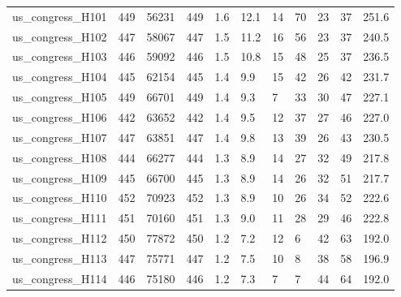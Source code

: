 \begin{longtable}{lllllllllll}
 us\_congress\_H101                                   & 449        & 56231     & 449   & 1.6    & 12.1   & 14    & 70     & 23     & 37     & 251.6   \\
 us\_congress\_H102                                   & 447        & 58067     & 447   & 1.5    & 11.2   & 16    & 56     & 23     & 37     & 240.5   \\
 us\_congress\_H103                                   & 446        & 59092     & 446   & 1.5    & 10.8   & 15    & 48     & 25     & 37     & 236.5   \\
 us\_congress\_H104                                   & 445        & 62154     & 445   & 1.4    & 9.9    & 15    & 42     & 26     & 42     & 231.7   \\
 us\_congress\_H105                                   & 449        & 66701     & 449   & 1.4    & 9.3    & 7     & 33     & 30     & 47     & 227.1   \\
 us\_congress\_H106                                   & 442        & 63652     & 442   & 1.4    & 9.5    & 12    & 37     & 27     & 46     & 227.0   \\
 us\_congress\_H107                                   & 447        & 63851     & 447   & 1.4    & 9.8    & 13    & 39     & 26     & 43     & 230.5   \\
 us\_congress\_H108                                   & 444        & 66277     & 444   & 1.3    & 8.9    & 14    & 27     & 32     & 49     & 217.8   \\
 us\_congress\_H109                                   & 445        & 66700     & 445   & 1.3    & 8.9    & 14    & 26     & 32     & 51     & 217.7   \\
 us\_congress\_H110                                   & 452        & 70923     & 452   & 1.3    & 8.9    & 10    & 26     & 34     & 52     & 222.6   \\
 us\_congress\_H111                                   & 451        & 70160     & 451   & 1.3    & 9.0    & 11    & 28     & 29     & 46     & 222.8   \\
 us\_congress\_H112                                   & 450        & 77872     & 450   & 1.2    & 7.2    & 12    & 6      & 42     & 63     & 192.0   \\
 us\_congress\_H113                                   & 447        & 75771     & 447   & 1.2    & 7.5    & 10    & 8      & 38     & 58     & 196.9   \\
 us\_congress\_H114                                   & 446        & 75180     & 446   & 1.2    & 7.3    & 7     & 7      & 44     & 64     & 192.0   \\

\end{longtable}
